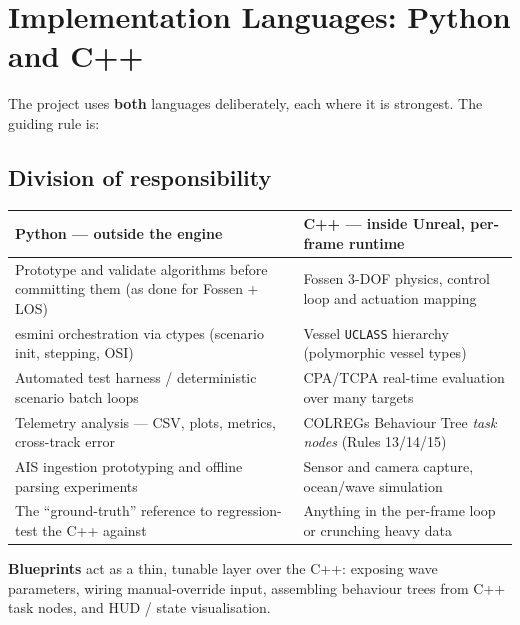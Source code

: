 \documentclass[11pt]{article}
\begin{document}
\section{Implementation Languages: Python and C++}
The project uses \textbf{both} languages deliberately, each where it is strongest. The guiding rule is:

\begin{center}
\end{center}

\subsection*{Division of responsibility}
\renewcommand{\arraystretch}{1.3}
\begin{center}
\footnotesize
\begin{tabular}{p{6.6cm} p{6.6cm}}
\toprule
\textbf{Python --- outside the engine} & \textbf{C++ --- inside Unreal, per-frame runtime} \\
\midrule
Prototype and validate algorithms before committing them (as done for Fossen + LOS) & Fossen 3-DOF physics, control loop and actuation mapping \\
esmini orchestration via ctypes (scenario init, stepping, OSI) & Vessel \texttt{UCLASS} hierarchy (polymorphic vessel types) \\
Automated test harness / deterministic scenario batch loops & CPA/TCPA real-time evaluation over many targets \\
Telemetry analysis --- CSV, plots, metrics, cross-track error & COLREGs Behaviour Tree \emph{task nodes} (Rules 13/14/15) \\
AIS ingestion prototyping and offline parsing experiments & Sensor and camera capture, ocean/wave simulation \\
The ``ground-truth'' reference to regression-test the C++ against & Anything in the per-frame loop or crunching heavy data \\
\bottomrule
\end{tabular}
\end{center}

\noindent\textbf{Blueprints} act as a thin, tunable layer over the C++: exposing wave parameters,
wiring manual-override input, assembling behaviour trees from C++ task nodes, and HUD / state
visualisation.
\end{document}

